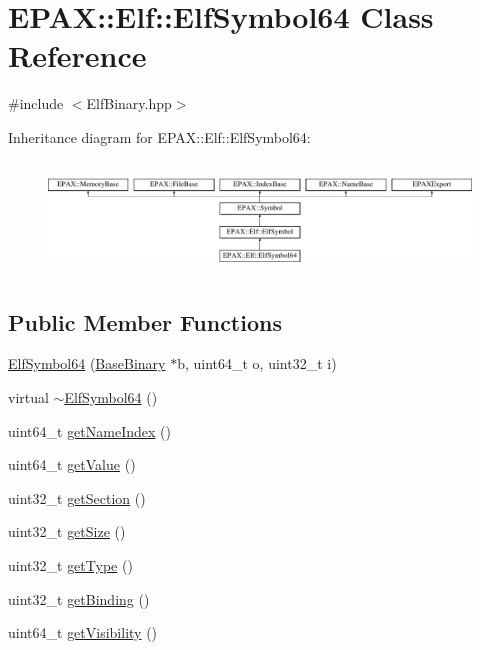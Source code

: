 \hypertarget{class_e_p_a_x_1_1_elf_1_1_elf_symbol64}{\section{\-E\-P\-A\-X\-:\-:\-Elf\-:\-:\-Elf\-Symbol64 \-Class \-Reference}
\label{class_e_p_a_x_1_1_elf_1_1_elf_symbol64}
}


{\ttfamily \#include $<$\-Elf\-Binary.\-hpp$>$}

\-Inheritance diagram for \-E\-P\-A\-X\-:\-:\-Elf\-:\-:\-Elf\-Symbol64\-:\begin{figure}[H]
\begin{center}
\leavevmode
\includegraphics[height=2.966887cm]{class_e_p_a_x_1_1_elf_1_1_elf_symbol64}
\end{center}
\end{figure}
\subsection*{\-Public \-Member \-Functions}
\begin{DoxyCompactItemize}
\item 
\hyperlink{class_e_p_a_x_1_1_elf_1_1_elf_symbol64_a6a2d4c76afce4bb068cff341c55f88a3}{\-Elf\-Symbol64} (\hyperlink{class_e_p_a_x_1_1_base_binary}{\-Base\-Binary} $\ast$b, uint64\-\_\-t o, uint32\-\_\-t i)
\item 
virtual \hyperlink{class_e_p_a_x_1_1_elf_1_1_elf_symbol64_a1f755b0726bba59f8965d37449658121}{$\sim$\-Elf\-Symbol64} ()
\item 
uint64\-\_\-t \hyperlink{class_e_p_a_x_1_1_elf_1_1_elf_symbol64_a6e8651a83dfdd485e87e013b4a4790e2}{get\-Name\-Index} ()
\item 
uint64\-\_\-t \hyperlink{class_e_p_a_x_1_1_elf_1_1_elf_symbol64_a47e49dde9967bc7cf3f8caeb3b1880fd}{get\-Value} ()
\item 
uint32\-\_\-t \hyperlink{class_e_p_a_x_1_1_elf_1_1_elf_symbol64_ad2acb7dbbf88685b5bfcfbed2ac1dba4}{get\-Section} ()
\item 
uint32\-\_\-t \hyperlink{class_e_p_a_x_1_1_elf_1_1_elf_symbol64_a26225a3989efc89a50fa934c53f47276}{get\-Size} ()
\item 
uint32\-\_\-t \hyperlink{class_e_p_a_x_1_1_elf_1_1_elf_symbol64_a397faa7562b27ba2d543328a69e17077}{get\-Type} ()
\item 
uint32\-\_\-t \hyperlink{class_e_p_a_x_1_1_elf_1_1_elf_symbol64_a341e642319d9b9f70ee9dfebdcad4f5b}{get\-Binding} ()
\item 
uint64\-\_\-t \hyperlink{class_e_p_a_x_1_1_elf_1_1_elf_symbol64_a0df4c678ba3e7c3e756c6a81152244fa}{get\-Visibility} ()
\end{DoxyCompactItemize}


